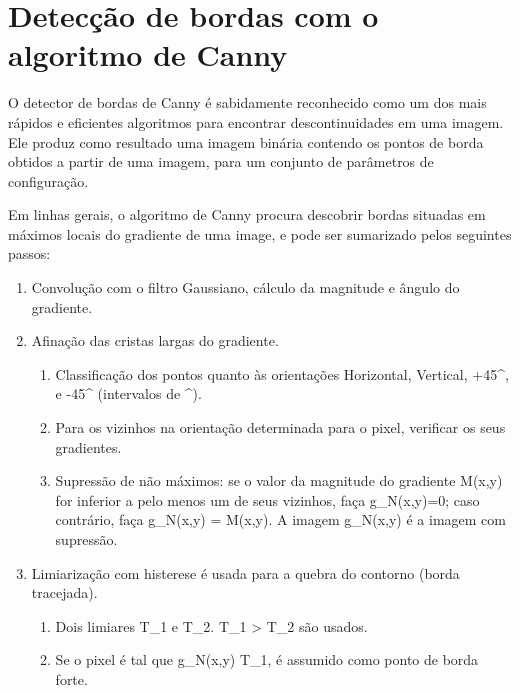\documentclass[11pt]{amsbook}
\begin{document}
\hypertarget{x-detecção-de-bordas-com-o-algoritmo-de-canny}{\chapter{Detecção de bordas com o algoritmo de Canny}}
O detector de bordas de Canny é sabidamente reconhecido como um dos
mais rápidos e eficientes algoritmos para encontrar descontinuidades
em uma imagem. Ele produz como resultado uma imagem binária contendo
os pontos de borda obtidos a partir de uma imagem, para um conjunto de
parâmetros de configuração.


Em linhas gerais, o algoritmo de Canny procura descobrir bordas situadas
em máximos locais do gradiente de uma image, e pode ser sumarizado
pelos seguintes passos:


\begin{enumerate}

\item{Convolução com o filtro Gaussiano, cálculo da magnitude e ângulo do
gradiente.}

\item{Afinação das cristas largas do gradiente.}

\begin{enumerate}

\item{Classificação dos pontos quanto às orientações Horizontal,
Vertical, +45^, e -45^
(intervalos de ^).}

\item{Para os vizinhos na orientação determinada para o pixel, verificar
os seus gradientes.}

\item{Supressão de não máximos: se o valor da magnitude do gradiente
M(x,y) for inferior a pelo menos um de seus vizinhos, faça
g_N(x,y)=0; caso contrário, faça g_N(x,y) =
M(x,y). A imagem g_N(x,y) é a imagem com supressão.}

\end{enumerate}

\item{Limiarização com histerese é usada para a quebra do contorno (borda
tracejada).}

\begin{enumerate}

\item{Dois limiares T_1 e T_2. T_1 > T_2 são usados.}

\item{Se o pixel é tal que g_N(x,y) \ge T_1, é assumido como ponto de borda forte.}


\end{enumerate}
\end{enumerate}
\end{document}
